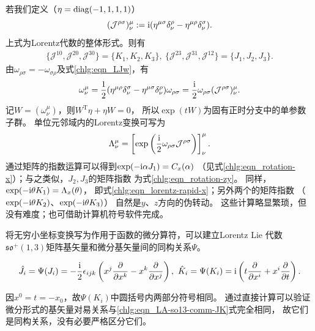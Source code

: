若我们定义（$\eta=\operatorname{diag} (-1,1,1,1)$）
\begin{equation}\label{chlg:eqn_LJw}
    (\mathcal{J}^{\rho\sigma})^\mu_{\nu} := \mathrm{i} ( \eta^{\mu\sigma} \delta^\rho_\nu -\eta^{\mu\rho} \delta^\sigma_\nu).
\end{equation}
上式为Lorentz代数的整体形式。则有
\begin{align}
    \{\mathcal{J}^{10},\mathcal{J}^{20},\mathcal{J}^{30} \} =\{K_1,K_2,K_3\}, \
    \{\mathcal{J}^{23},\mathcal{J}^{31},\mathcal{J}^{12} \} =\{J_1,J_2,J_3\}.
\end{align}
由$\omega_{\rho\sigma}=-\omega_{\sigma\rho}$及式\eqref{chlg:eqn_LJw}，有
\[
 \omega^\mu_{\nu}=\frac12
 (\eta^{\mu\rho}\delta^\sigma_\nu-\eta^{\mu\sigma}\delta^\rho_\nu)\omega_{\rho\sigma}
 =\frac{\mathrm{i}}{2}\omega_{\rho\sigma}(\mathcal J^{\rho\sigma})^\mu_\nu .
\]
记$W=(\omega^\mu_\nu)$，则$W^{\mathrm T}\eta+\eta W=0$，
所以$\exp(tW)$为固有正时分支中的单参数子群。
单位元邻域内的Lorentz变换可写为
\begin{equation}
 \Lambda^\mu_\nu=
 \left[\exp\left(\frac{\mathrm{i}}{2}\omega_{\rho\sigma}\mathcal J^{\rho\sigma}\right)\right]^\mu_\nu .
\end{equation}
通过矩阵的指数运算可以得到$\exp(-\mathrm{i} \alpha J_1)= C_x(\alpha)$
（见式\eqref{chlg:eqn_rotation-x}）；与之类似，$J_2,J_3$的矩阵指数
为式\eqref{chlg:eqn_rotation-zy}。
同样，$\exp(-\mathrm{i} \theta K_1)= \Lambda_x(\theta)$，
即式\eqref{chlg:eqn_lorentz-rapid-x}；另外两个的矩阵指数
（$\exp(-\mathrm{i} \theta K_2)$、$\exp(-\mathrm{i} \theta K_3)$）
自然是$y$、$z$方向的伪转动。
这些计算略显繁琐，但没有难度；也可借助计算机符号软件完成。

将无穷小坐标变换写为作用于函数的微分算符，可以建立Lorentz Lie 代数$\mathfrak{so}^{+}(1,3)$矩阵基矢量和微分基矢量间的同构关系$\Psi$。
\begin{small}

\begin{equation}\label{chlg:eqn_LA-so13-JK-diff}
    \hat{J}_i=\Psi(J_i)= -\frac{\mathrm{i} }{2}\epsilon_{ijk} \left(x^j\frac{\partial }{\partial x^k}
    - x^k\frac{\partial }{\partial x^j}\right), \
    \hat{K}_i=\Psi(K_i)= \mathrm{i} \left(t\frac{\partial }{\partial x^i}+  x^i\frac{\partial }{\partial t}\right) .
\end{equation}
\end{small}
因$x^0 = t=-x_0$，故$\Psi(K_i)$中圆括号内两部分符号相同。
通过直接计算可以验证微分形式的基矢量对易关系与\eqref{chlg:eqn_LA-so13-comm-JK}式完全相同，
故它们是同构关系，没有必要严格区分它们。


